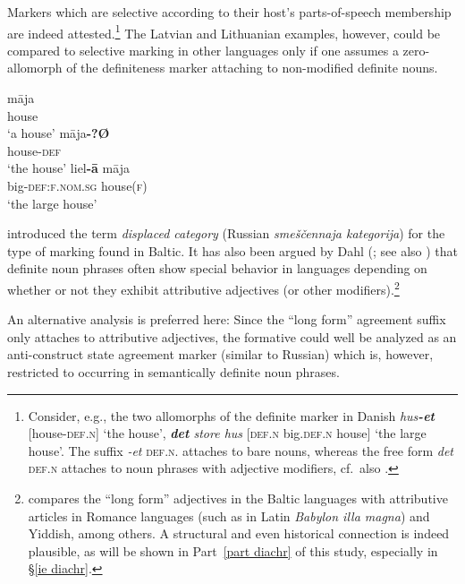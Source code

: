 Markers which are selective according to their host's parts-of-speech membership are indeed attested.\footnote{Consider, e.g., the two allomorphs of the definite marker in Danish \textit{hus\textbf{-et}} [house-\textsc{def.n}] ‘the house’, \textit{\textbf{det} store hus} [\textsc{def.n} big\textsc{.def.n} house] ‘the large house’. The suffix \textit{-et} \textsc{def.n.} attaches to bare nouns, whereas the free form \textit{det} \textsc{def.n} attaches to noun phrases with adjective modifiers, cf.~also .} The Latvian and Lithuanian examples, however, could be compared to selective marking in other languages only if one assumes a zero-allomorph of the definiteness marker attaching to non-modified definite nouns.
\begin{exe}
\ex
{}
\begin{xlist}
\ex
\gll 	māja\\
	house\\
\glt	‘a house’
\ex	
\gll 	māja\textbf{-?Ø}\\
	house-\textsc{def}\\
\glt	‘the house’
\ex		
\gll 	liel\textbf{-ā} māja\\
	big-\textsc{def:f.nom.sg} house(\textsc{f})\\
\glt	‘the large house’
\end{xlist}
\end{exe}
\citet[31]{melcuk1998} introduced the term \emph{displaced category} (Russian \emph{smeščennaja kategorija}) for the type of marking found in Baltic. It has also been argued by Dahl (\citeyear[149–152]{dahl2003}; see also \citealt[115]{dahl2007}) that definite noun phrases often show special behavior in languages depending on whether or not they exhibit attributive adjectives (or other modifiers).\footnote{\citet[150]{dahl2003} compares the “long form” adjectives in the Baltic languages with attributive articles in Romance languages (such as in Latin \textit{Babylon illa magna}) and Yiddish, among others. A structural and even historical connection is indeed plausible, as will be shown in Part~\ref{part diachr} of this study, especially in \S\ref{ie diachr}.}

An alternative analysis is preferred here: Since the “long form” agreement suffix only attaches to attributive adjectives, the formative could well be analyzed as an anti-construct state agreement marker (similar to Russian) which is, however, restricted to occurring in semantically definite noun phrases. 

